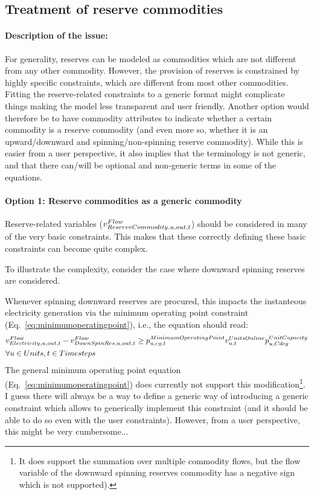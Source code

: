 
\subsection{Treatment of reserve commodities} \label{subsec:reserve_commodities}

\paragraph{Description of the issue:} For generality, reserves can be modeled as commodities which are not different from any other commodity. However, the provision of reserves is constrained by highly specific constraints, which are different from most other commodities. Fitting the reserve-related constraints to a generic format might complicate things making the model less transparent and user friendly. Another option would therefore be to have commodity attributes to indicate whether a certain commodity is a reserve commodity (and even more so, whether it is an upward/downward and spinning/non-spinning reserve commodity). While this is easier from a user perspective, it also implies that the terminology is not generic, and that there can/will be optional and non-generic terms in some of the equations.


\paragraph{Option 1: Reserve commodities as a generic commodity}
Reserve-related variables ($\vFlow[ReserveCommodity,\unit,out,\timestep]$) should be considered in many of the very basic constraints. This makes that these correctly defining these basic constraints can become quite complex. 

To illustrate the complexity, consider the case where downward spinning reserves are considered. 

Whenever spinning downward reserves are procured, this impacts the instanteous electricity generation via the minimum operating point constraint (Eq.~\eqref{eq:minimumoperatingpoint}), i.e., the equation should read:
\begin{align} 
& \vFlow[Electricity,\unit,out,\timestep] - \vFlow[DownSpinRes,\unit,out,\timestep] \ge \pMinimumOperatingPoint \vUnitsOnline \pUnitCapacity \nonumber \\
& \forall \units, \timesteps
\end{align}
The general minimum operating point equation (Eq.~\eqref{eq:minimumoperatingpoint}) does currently not support this modification\footnote{It does support the summation over multiple commodity flows, but the flow variable of the downward spinning reserves commodity has a negative sign which is not supported).}. I guess there will always be a way to define a generic way of introducing a generic constraint which allows to generically implement this constraint (and it should be able to do so even with the user constraints). However, from a user perspective, this might be very cumbersome... 



